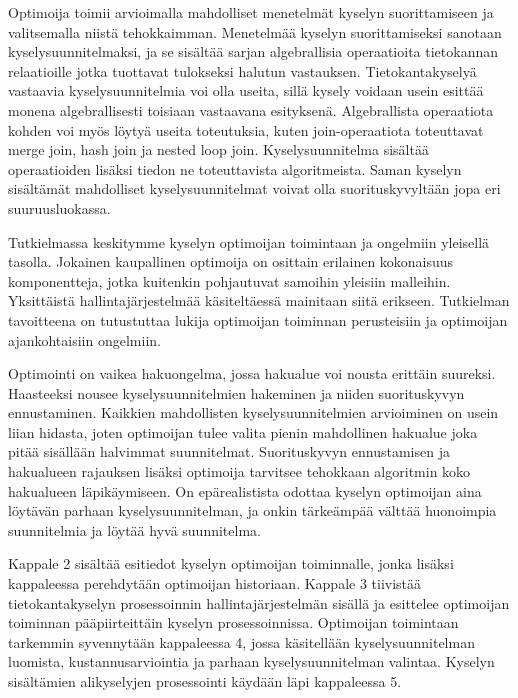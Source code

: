 \documentclass[finnish]{tktltiki2}
\theoremstyle{definition}
\theoremstyle{remark}
\begin{document}
Optimoija toimii arvioimalla mahdolliset menetelmät kyselyn suorittamiseen ja valitsemalla niistä tehokkaimman. \cite{selinger1979access} Menetelmää kyselyn suorittamiseksi sanotaan kyselysuunnitelmaksi, ja se sisältää sarjan algebrallisia operaatioita tietokannan relaatioille jotka tuottavat tulokseksi halutun vastauksen. Tietokantakyselyä vastaavia kyselysuunnitelmia voi olla useita, sillä kysely voidaan usein esittää monena algebrallisesti toisiaan vastaavana esityksenä. \cite{jarke1984} Algebrallista operaatiota kohden voi myös löytyä useita toteutuksia, kuten join-operaatiota toteuttavat merge join, hash join ja nested loop join. Kyselysuunnitelma sisältää operaatioiden lisäksi tiedon ne toteuttavista algoritmeista. Saman kyselyn sisältämät mahdolliset kyselysuunnitelmat voivat olla suorituskyvyltään jopa eri suuruusluokassa. \cite{ioannidis1996query, oracle2013refman}


Tutkielmassa keskitymme kyselyn optimoijan toimintaan ja ongelmiin yleisellä tasolla. Jokainen kaupallinen optimoija on osittain erilainen kokonaisuus komponentteja, jotka kuitenkin pohjautuvat samoihin yleisiin malleihin. Yksittäistä hallintajärjestelmää käsiteltäessä mainitaan siitä erikseen. Tutkielman tavoitteena on tutustuttaa lukija optimoijan toiminnan perusteisiin ja optimoijan ajankohtaisiin ongelmiin.

Optimointi on vaikea hakuongelma, jossa hakualue voi nousta erittäin suureksi. Haasteeksi nousee kyselysuunnitelmien hakeminen ja niiden suorituskyvyn ennustaminen. Kaikkien mahdollisten kyselysuunnitelmien arvioiminen on usein liian hidasta, joten optimoijan tulee valita pienin mahdollinen hakualue joka pitää sisällään halvimmat suunnitelmat. \cite{chaudhuri1998}  Suorituskyvyn ennustamisen ja hakualueen rajauksen lisäksi optimoija tarvitsee tehokkaan algoritmin koko hakualueen läpikäymiseen. On epärealistista odottaa kyselyn optimoijan aina löytävän parhaan kyselysuunnitelman, ja onkin tärkeämpää välttää huonoimpia suunnitelmia ja löytää hyvä suunnitelma. \cite{ramakrishnan2003database}

Kappale 2 sisältää esitiedot kyselyn optimoijan toiminnalle, jonka lisäksi kappaleessa perehdytään optimoijan historiaan. Kappale 3 tiivistää tietokantakyselyn prosessoinnin hallintajärjestelmän sisällä ja esittelee optimoijan toiminnan pääpiirteittäin kyselyn prosessoinnissa. Optimoijan toimintaan tarkemmin syvennytään kappaleessa 4, jossa käsitellään kyselysuunnitelman luomista, kustannusarviointia ja parhaan kyselysuunnitelman valintaa. Kyselyn sisältämien alikyselyjen prosessointi käydään läpi kappaleessa 5.
\end{document}
